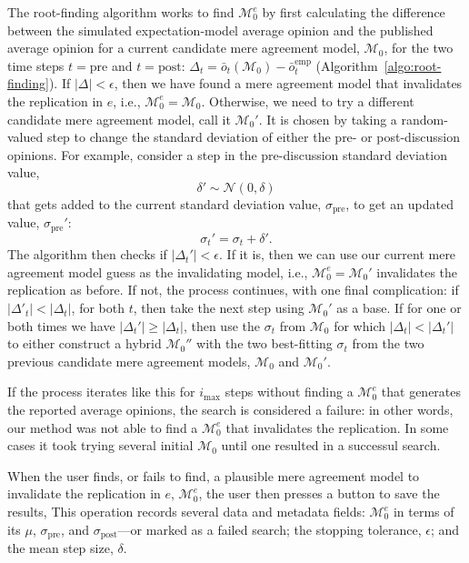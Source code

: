 \documentclass[preview]{article}
\newcommand{\sigmapre}{\sigma_\mathrm{pre}}
\newcommand{\sigmapost}{\sigma_\mathrm{post}}
\newcommand{\meanobs}{\bar{o}}
\newcommand{\meanobsemp}{\meanobs^\mathrm{emp}}
\newcommand{\nullmodel}{\mathcal{M}_0}
\begin{document}
The root-finding algorithm works to find $\nullmodel^e$ by first calculating
the difference between the simulated expectation-model average opinion and the 
published average opinion for a current candidate mere agreement model, $\nullmodel$,
for the two time steps $t=\mathrm{pre}$ and $t=\mathrm{post}$: 
$\Delta_t = \bar{o}_t(\nullmodel) - \meanobsemp_t$ (Algorithm~\ref{algo:root-finding}). 
If $| \Delta | < \epsilon$, then we have found a mere agreement model that invalidates the
replication in $e$, i.e., $\nullmodel^e = \nullmodel$. Otherwise, we need to try a
different candidate mere agreement model, call it $\nullmodel'$. It is chosen by taking a
random-valued step to change the standard deviation of either the pre-
or post-discussion opinions. For example, consider a step in the pre-discussion
standard deviation value,
\begin{equation}
  \delta' \sim \mathcal{N}(0, \delta)
\end{equation}
\noindent
that gets added to the current standard deviation value, $\sigmapre$, to
get an updated value, $\sigmapre'$:
\begin{equation}
  \sigma_t' = \sigma_t + \delta'.
\end{equation}
\noindent
The algorithm then checks if $|\Delta_t'| < \epsilon$. If it is, then we can use our
current mere agreement model guess as the invalidating model, i.e., 
$\nullmodel^e = \nullmodel'$ invalidates the replication as before. If not,
the process continues, with one final complication: if $|\Delta'_t| < |\Delta_t|$,
for both $t$, then take the next step using $\nullmodel'$ as a base. If for
one or both times we have $|\Delta_t'| \geq |\Delta_t|$, then use the 
$\sigma_t$ from $\nullmodel$ for which $|\Delta_t| < |\Delta_t'|$ to either construct a
hybrid $\nullmodel''$ with the two best-fitting $\sigma_t$ from the two
previous candidate mere agreement models, $\nullmodel$ and $\nullmodel'$.

If the process iterates like this for $i_\mathrm{max}$
steps without finding a $\nullmodel^e$ that generates the reported 
average opinions, the search is considered a failure: in other words, our method was
not able to find a $\nullmodel^e$ that invalidates the replication.
In some cases it took trying several initial $\nullmodel$ until one resulted in
a successul search. 

When the user finds, or fails to find, a plausible mere agreement model to invalidate
the replication in $e$, $\nullmodel^e$, the user then presses a button to save the
results, This operation records several data and metadata fields: $\nullmodel^e$ in
terms of its $\mu$, $\sigmapre$, and $\sigmapost$—or marked as a failed search; the
stopping tolerance, $\epsilon$; and the mean step size, $\delta$. 
\end{document}
